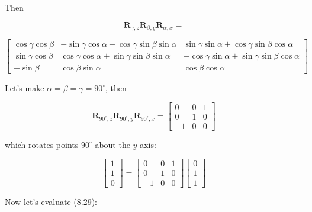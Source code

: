 \documentclass[10pt]{article}
\begin{document}
Then

$$
\mathbf{R}_{\gamma, z} \mathbf{R}_{\beta, y} \mathbf{R}_{\alpha, x}=
$$

$\left[\begin{array}{ccc}\cos \gamma \cos \beta & -\sin \gamma \cos \alpha+\cos \gamma \sin \beta \sin \alpha & \sin \gamma \sin \alpha+\cos \gamma \sin \beta \cos \alpha \\ \sin \gamma \cos \beta & \cos \gamma \cos \alpha+\sin \gamma \sin \beta \sin \alpha & -\cos \gamma \sin \alpha+\sin \gamma \sin \beta \cos \alpha \\ -\sin \beta & \cos \beta \sin \alpha & \cos \beta \cos \alpha\end{array}\right]$

Let's make $\alpha=\beta=\gamma=90^{\circ}$, then

$$
\mathbf{R}_{90^{\circ}, z} \mathbf{R}_{90^{\circ}, y} \mathbf{R}_{90^{\circ}, x}=\left[\begin{array}{ccc}
0 & 0 & 1 \\
0 & 1 & 0 \\
-1 & 0 & 0
\end{array}\right]
$$

which rotates points $90^{\circ}$ about the $y$-axis:

$$
\left[\begin{array}{l}
1 \\
1 \\
0
\end{array}\right]=\left[\begin{array}{ccc}
0 & 0 & 1 \\
0 & 1 & 0 \\
-1 & 0 & 0
\end{array}\right]\left[\begin{array}{l}
0 \\
1 \\
1
\end{array}\right]
$$

Now let's evaluate (8.29):
\end{document}
